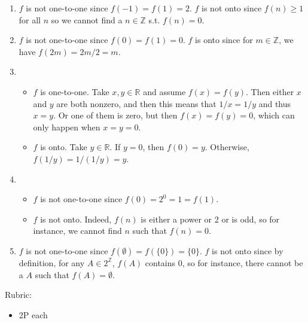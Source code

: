 \documentclass{article}
\newcommand{\Z}{\mathbb{Z}}
\newcommand{\R}{\mathbb{R}}
\theoremstyle{definition}
\begin{document}
\begin{solution}
\begin{enumerate}
	\item \(f\) is not one-to-one since \(f(-1) = f(1) = 2\). \(f\) is not onto since \(f(n) \geq 1\) for all \(n\) so we cannot find a \(n \in \Z\) s.t. \(f(n) = 0\).
	
	\item \(f\) is not one-to-one since \(f(0) = f(1) = 0\). \(f\) is onto since for \(m \in \Z\), we have \(f(2m) = 2m/2 = m\).
	
	\item
	\begin{itemize}
		\item \(f\) is one-to-one. Take \(x, y \in \R\) and assume \(f(x) = f(y)\). Then either \(x\) and \(y\) are both nonzero, and then this means that \(1/x = 1/y\) and thus \(x = y\). Or one of them is zero, but then \(f(x) = f(y) = 0\), which can only happen when \(x = y = 0\).
		\item \(f\) is onto. Take \(y \in \R\). If \(y = 0\), then \(f(0) = y\). Otherwise, \(f(1/y) = 1/(1/y) = y\).
	\end{itemize}
	
	\item 
	
	\begin{itemize}
		\item \(f\) is not one-to-one since \(f(0) = 2^0 = 1 = f(1)\).
		
		\item \(f\) is not onto. Indeed, \(f(n)\) is either a power or 2 or is odd, so for instance, we cannot find \(n\) such that \(f(n) = 0\).
		
	\end{itemize}
	
	\item \(f\) is not one-to-one since \(f(\emptyset) = f(\{0 \}) = \{ 0 \}\). \(f\) is not onto since by definition, for any \(A \in 2^{\Z}\), \(f(A)\) contains 0, so for instance, there cannot be a \(A\) such that \(f(A) = \emptyset\).
	
\end{enumerate}

{\color{red} Rubric:
\begin{itemize}
\item 2P each
\end{itemize}}
\end{solution}
\end{document}

